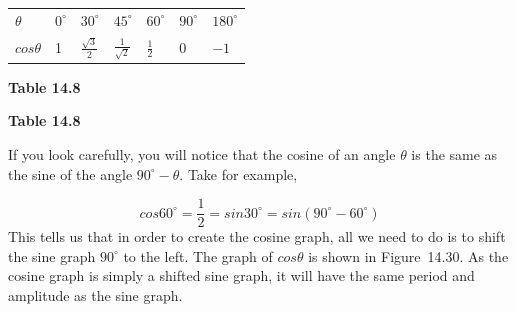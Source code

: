 \begin{table}[H]
\begin{center}
\label{m39414*id86909}
\noindent
{}
\tablelasttail{}
\begin{xtabular}[t]{|l|l|l|l|l|l|l|}\hline
    $\theta $
    &
    ${0}^{\circ }$
    &
    ${30}^{\circ }$
    &
    ${45}^{\circ }$
    &
    ${60}^{\circ }$
    &
    ${90}^{\circ }$
    &
    ${180}^{\circ }$
\tabularnewline{}
    $cos\theta $
    &
1 &
    $\frac{\sqrt{3}}{2}$
    &
    $\frac{1}{\sqrt{2}}$
    &
    $\frac{1}{2}$
    &
0 &
    $-1$
\tabularnewline{}
\end{xtabular}
\end{center}
\begin{center}{\small\bfseries Table 14.8}\end{center}
\begin{caption}{\small\bfseries Table 14.8}\end{caption}
\end{table}
\par
If you look carefully, you will notice that the cosine of an angle $\theta $ is the same as the sine of the angle ${90}^{\circ }-\theta $. Take for example,\par 
\nopagebreak\noindent{}
\begin{equation*}
cos{60}^{\circ }=\frac{1}{2}=sin{30}^{\circ }=sin({90}^{\circ }-{60}^{\circ })
\end{equation*}
This tells us that in order to create the cosine graph, all we need to do is to shift the sine graph ${90}^{\circ }$ to the left. The graph of $cos\theta $ is shown in Figure~14.30. As the cosine graph is simply a shifted sine graph, it will have the same period and amplitude as the sine graph.\par 
\setcounter{subfigure}{0}
